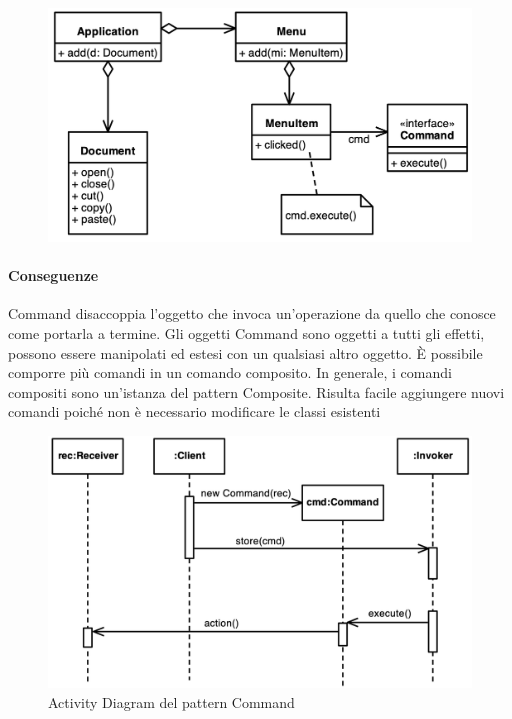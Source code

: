 \begin{figure}[H]
    \centering
    \includegraphics[width=1\linewidth]{assets/pattern/command/command-esempio.png}
\end{figure}

\paragraph{Conseguenze} Command disaccoppia l’oggetto che invoca un’operazione da quello che conosce come portarla a termine. 
Gli oggetti Command sono oggetti a tutti gli effetti, possono essere manipolati ed estesi con un qualsiasi altro oggetto. 
È possibile comporre più comandi in un comando composito.
In generale, i comandi compositi sono un’istanza del pattern Composite.
Risulta facile aggiungere nuovi comandi poiché non è necessario modificare le classi esistenti

\begin{figure}[H]
    \centering
    \includegraphics[width=1\linewidth]{assets/pattern/command/command-activity.png}
    \caption{Activity Diagram del pattern Command}
\end{figure}



\newpage